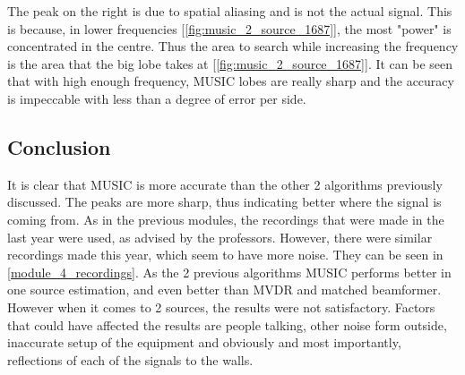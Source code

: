 The peak on the right is due to spatial aliasing and is not the actual signal. This is because, in lower frequencies [\ref{fig:music_2_source_1687}], the most "power" is concentrated in the centre. Thus the area to search while increasing the frequency is the area that the big lobe takes at [\ref{fig:music_2_source_1687}].
It can be seen that with high enough frequency, MUSIC lobes are really sharp and the accuracy is impeccable with less than a degree of error per side.

\subsection{Conclusion}

It is clear that MUSIC is more accurate than the other 2 algorithms previously discussed. The peaks are more sharp, thus indicating better where the signal is coming from. As in the previous modules, the recordings that were made in the last year were used, as advised by the professors. However, there were similar recordings made this year, which seem to have more noise. They can be seen in \ref{module_4_recordings}. As the 2 previous algorithms MUSIC performs better in one source estimation, and even better than MVDR and matched beamformer. However when it comes to 2 sources, the results were not satisfactory. Factors that could have affected the results are people talking, other noise form outside, inaccurate setup of the equipment and obviously and most importantly, reflections of each of the signals to the walls.


